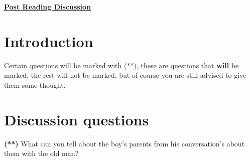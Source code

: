 \documentclass[12pt]{article} %
\begin{document}
	\renewcommand*{\coursecode}{MATH 235} %
	\renewcommand*{\assgnnumber}{Assignment 1} %
	\renewcommand*{\submdate}{September 14, 2021} %
	\renewcommand*{\studentfname}{Abdullah} %
	\renewcommand*{\studentlname}{Zubair} %
    \renewcommand*{\proofname}{Proof:}

	\renewcommand\qedsymbol{$\blacksquare$}
	\setfigpath
	\fancyhfoffset[L,O]{0pt} %




\begin{center}
	\textbf{\underline{\Huge{Post Reading Discussion}}}
\end{center}

\section*{Introduction}
Certain questions will be marked with (**), these are questions that \textbf{will} be marked, the rest will not be
marked, but of course you are still advised to give them some thought.

\section*{Discussion questions}
\begin{qstn}
  \textbf{(**)} What can you tell about the boy's parents from his conversation's about them with the old man?
\end{qstn}
\end{document}
